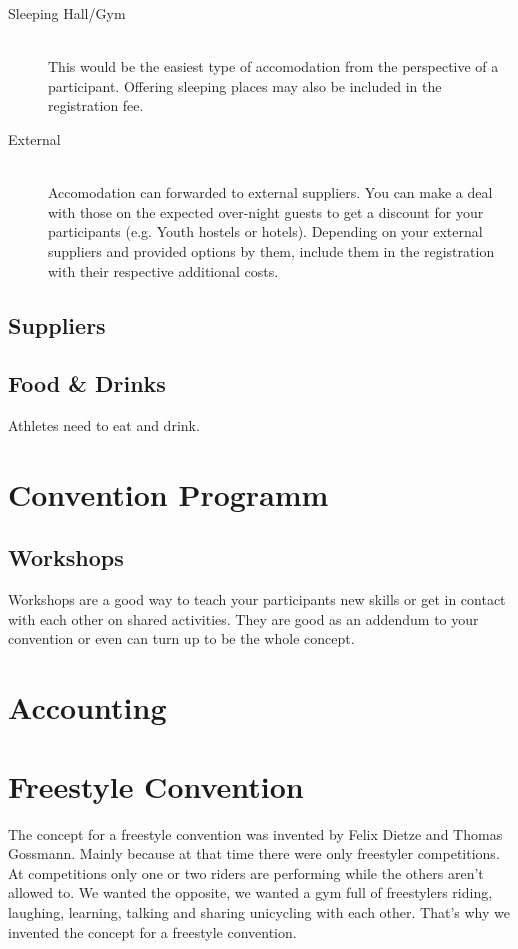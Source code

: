 \documentclass[11pt]{report}
\begin{document}
\begin{description}
	\item [Sleeping Hall/Gym] \hfill \\ 
		This would be the easiest type of accomodation from the perspective of a 
		participant. Offering sleeping places may also be included in the 
		registration fee.
	\item [External] \hfill \\
		Accomodation can forwarded to external suppliers. You can make a deal with 
		those on the expected over-night guests to get a discount for your 
		participants (e.g. Youth hostels or hotels). Depending on your external 
		suppliers and provided options by them, include them in the registration 
		with their respective additional costs.
\end{description}

\section{Suppliers}

\section{Food \& Drinks}
Athletes need to eat and drink.


\chapter{Convention Programm}

\section{Workshops}
Workshops are a good way to teach your participants new skills or get in contact 
with each other on shared activities. They are good as an addendum to your 
convention or even can turn up to be the whole concept.

\chapter{Accounting}

\chapter{Freestyle Convention}

The concept for a freestyle convention was invented by Felix Dietze and Thomas 
Gossmann. Mainly because at that time there were only freestyler competitions.
At competitions only one or two riders are performing while the others aren't 
allowed to. We wanted the opposite, we wanted a gym full of freestylers riding, 
laughing, learning, talking and sharing unicycling with each other. That's why 
we invented the concept for a freestyle convention.
\end{document}
